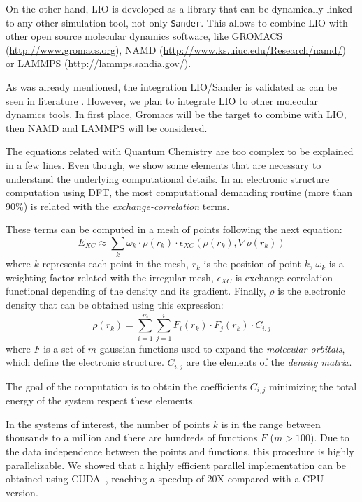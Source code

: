 \documentclass[a4paper,10pt]{article}
\begin{document}
On the other hand, LIO is developed as a library that can be dynamically linked to any other simulation tool, not only \texttt{Sander}.
This allows to combine LIO with other open source molecular dynamics software, like GROMACS (\url{http://www.gromacs.org}), NAMD (\url{http://www.ks.uiuc.edu/Research/namd/}) or LAMMPS (\url{http://lammps.sandia.gov/}).

As was already mentioned, the integration LIO/Sander is validated as can be seen in literature . 
However, we plan to integrate LIO to other molecular dynamics tools.
In first place, Gromacs will be the target to combine with LIO, then NAMD and LAMMPS will be considered.

The equations related with Quantum Chemistry are too complex to be explained in a few lines. 
Even though, we show some elements that are necessary to understand the underlying computational details. 
In an electronic structure computation using DFT, the most computational demanding routine (more than $90\%$) is related with the \emph{exchange-correlation} terms.

These terms can be computed in a mesh of points following the next equation:
\begin{equation}
    \label{eq:xc}
    E_{XC} \approx \sum_k \omega_k \cdot \rho(r_k) \cdot \epsilon_{XC} \left(\rho(r_k),\nabla \rho(r_k)\right)
\end{equation}
where $k$ represents each point in the mesh, $r_k$ is the position of point $k$, $\omega_k$ is a weighting factor related with the irregular mesh, $\epsilon_{XC}$ is exchange-correlation functional depending of the density and its gradient. 
Finally, $\rho$ is the electronic density that can be obtained using this expression:
\begin{equation}
  \label{eq:rho-xc}
  \rho(r_k) = \sum^m_{i=1} \sum^i_{j=1} F_i(r_k) \cdot F_j(r_k) \cdot C_{i,j}
\end{equation}
where $F$ is a set of $m$ gaussian functions used to expand the \emph{molecular orbitals}, which define the electronic structure. $C_{i,j}$ are the elements of the \emph{density matrix}.

The goal of the computation is to obtain the coefficients $C_{i,j}$ minimizing the total energy of the system respect these elements.

In the systems of interest, the number of points $k$ is in the range between thousands to a million and there are hundreds of functions $F$ ($m>100$). 
Due to the data independence between the points and functions, this procedure is highly parallelizable.
We showed that a highly efficient parallel implementation can be obtained using CUDA~\cite{Nitsche2014}, reaching a speedup of 20X compared with a CPU version.
\end{document}
